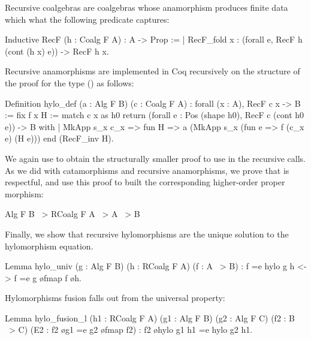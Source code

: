\documentclass[anonymous, a4paper, UKenglish, cleveref, autoref, thm-restate]{lipics-v2021}
\begin{document}
Recursive coalgebras are coalgebras whose anamorphism produces finite data which
what the following predicate captures:
\begin{coqcode}
Inductive RecF (h : Coalg F A) : A -> Prop :=
| RecF_fold x : (forall e, RecF h (cont (h x) e)) -> RecF h x.
\end{coqcode}
Recursive anamorphisms are implemented in Coq recursively on the structure of
the proof for the type () as follows:
\begin{coqcode}
Definition hylo_def (a : Alg F B) (c : Coalg F A)
  : forall (x : A), RecF c x -> B := fix f x H
  := match c x as h0 return
       (forall e : Pos (shape h0), RecF c (cont h0 e)) -> B
     with
     | MkApp s_x c_x => fun H => a (MkApp s_x (fun e => f (c_x e) (H e)))
     end (RecF_inv H).
\end{coqcode}
We again use  to obtain the structurally smaller proof to use in
the recursive calls. As we did with catamorphisms and recursive anamorphisms, we
prove that  is respectful, and use this proof to built the
corresponding higher-order proper morphism:
\begin{coqcode}
Alg F B ~> RCoalg F A ~> A ~> B
\end{coqcode}
Finally, we show that recursive hylomorphisms are the unique solution to the
hylomorphism equation.
\begin{coqcode}
Lemma hylo_univ (g : Alg F B) (h : RCoalg F A) (f : A ~> B)
    : f =e hylo g h <-> f =e g \o fmap f \o h.
\end{coqcode}
Hylomorphisms fusion falls out from the universal property:
\begin{coqcode}
Lemma hylo_fusion_l (h1 : RCoalg F A) (g1 : Alg F B) (g2 : Alg F C)
  (f2 : B ~> C) (E2 : f2 \o g1 =e g2 \o fmap f2) : f2 \o hylo g1 h1 =e hylo g2 h1.
\end{coqcode}

\end{document}
